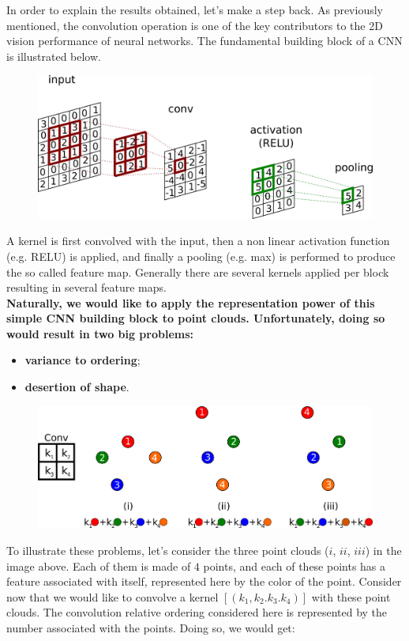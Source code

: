 \documentclass[11pt,a4paper]{article}
\begin{document}
\noindent
In order to explain the results obtained, let's make a step back. As previously mentioned, the convolution operation is one of the key contributors to the 2D vision performance of neural networks. The fundamental building block of a CNN is illustrated below.
\begin{figure}[H]
    \centering
    \includegraphics[scale=0.1]{imgs/conv.png}
\end{figure}
\noindent
A kernel is first convolved with the input, then a non linear activation function (e.g. RELU) is applied, and finally a pooling (e.g. max) is performed to produce the so called feature map. Generally there are several kernels applied per block resulting in several feature maps.\\
\textbf{Naturally, we would like to apply the representation power of this simple CNN building block to point clouds. Unfortunately, doing so would result in two big problems:}
\begin{itemize}
    \item \textbf{variance to ordering};
    \item \textbf{desertion of shape}.
\end{itemize}
\begin{figure}[H]
    \centering
    \includegraphics[scale=0.5]{imgs/conv-pointcloud-problem-statement.png}
\end{figure}
\noindent
To illustrate these problems, let's consider the three point clouds ($i$, $ii$, $iii$) in the image above. Each of them is made of $4$ points, and each of these points has a feature associated with itself, represented here by the color of the point. Consider now that we would like to convolve a kernel $[(k_1, k_2. k_3. k_4)]$ with these point clouds. The convolution relative ordering considered here is represented by the number associated with the points. Doing so, we would get:
\end{document}
